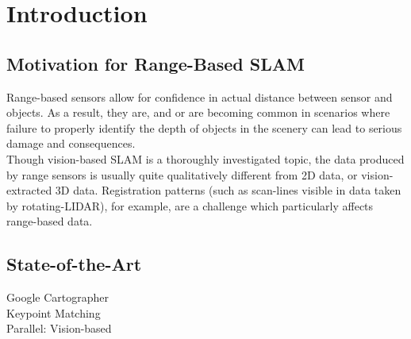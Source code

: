\chapter{Introduction}
\label{sec:introduction}

\section{Motivation for Range-Based SLAM}
\label{sec:motivation}

Range-based sensors allow for confidence in actual distance between sensor and objects. As a result, they are, and or are becoming common in scenarios where failure to properly identify the depth of objects in the scenery can lead to serious damage and consequences.\\%

Though vision-based SLAM is a thoroughly investigated topic, the data produced by range sensors is usually quite qualitatively different from 2D data, or vision-extracted 3D data. Registration patterns (such as scan-lines visible in data taken by rotating-LIDAR), for example, are a challenge which particularly affects range-based data.\\

\section{State-of-the-Art}
\label{sec:SOTA}

Google Cartographer\\
Keypoint Matching\\
Parallel: Vision-based\\
